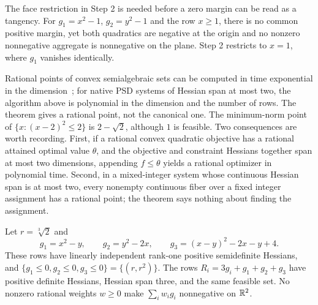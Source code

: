 The face restriction in Step 2 is needed before a zero margin can be read as
a tangency. For $g_1=x^2-1$, $g_2=y^2-1$ and the row $x\ge1$, there is no
common positive margin, yet both quadratics are negative at the origin and no
nonzero nonnegative aggregate is nonnegative on the plane. Step 2 restricts to
$x=1$, where $g_1$ vanishes identically.

Rational points of convex semialgebraic sets can be computed in time
exponential in the dimension~\cite{SafeyElDinZhi2010}; for native PSD systems
of Hessian span at most two, the algorithm above is polynomial in the
dimension and the number of rows. The theorem gives a rational point, not the
canonical one. The minimum-norm
point of $\{x:(x-2)^2\le2\}$ is $2-\sqrt2$, although $1$ is feasible. Two
consequences are worth recording. First, if a rational convex quadratic
objective has a rational attained optimal value $\theta$, and the objective and
constraint Hessians together span at most two dimensions, appending
$f\le\theta$ yields a rational optimizer in polynomial time. Second, in a
mixed-integer system whose continuous Hessian span is at most two, every
nonempty continuous fiber over a fixed integer assignment has a rational
point; the theorem says nothing about finding the assignment.

\begin{proposition}
\label{prop:qc-span-three}
Let $r=\sqrt[3]2$ and
\[
g_1=x^2-y,\qquad g_2=y^2-2x,\qquad g_3=(x-y)^2-2x-y+4 .
\]
These rows have linearly independent rank-one positive semidefinite Hessians,
and $\{g_1\le0,g_2\le0,g_3\le0\}=\{(r,r^2)\}$. The rows
$R_i=3g_i+g_1+g_2+g_3$ have positive definite Hessians, Hessian span three,
and the same feasible set. No nonzero rational weights $w\ge0$ make
$\sum_iw_ig_i$ nonnegative on $\mathbb R^2$.
\end{proposition}

